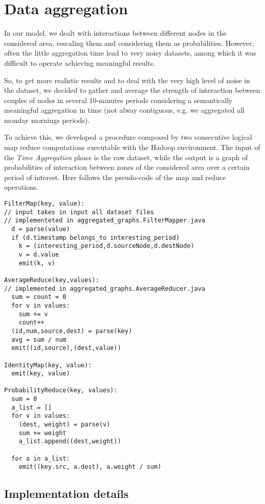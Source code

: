 \section{Data aggregation}
\label{aggregation}
In our model, we dealt with interactions between different nodes in the considered area, rescaling them and considering them as probabilities.
However, often the little aggregation time lead to very noisy datasets, among which it was difficult to operate achieving meaningful results.

So, to get more realistic results and to deal with the very high level of noise in the dataset,
we decided to gather and average the strength of interaction between couples of nodes in several 10-minutes periods
considering a semantically meaningful aggregation in time (not alway contiguous, e.g. we aggregated all monday
mornings periods).

To achieve this, we developed a procedure composed by two consecutive logical map reduce computations executable with the Hadoop environment.
The input of the \emph{Time Aggregation} phase is the raw dataset, while the output is a graph of probabilities of interaction between zones of the considered area
over a certain period of interest.
Here follows the pseudo-code of the map and reduce operations.

\begin{verbatim}
FilterMap(key, value):
// input takes in input all dataset files
// implementeted in aggregated_graphs.FilterMapper.java
  d = parse(value)
  if (d.timestamp belongs_to interesting_period)
  	k = (interesting_period,d.sourceNode,d.destNode)
  	v = d.value
    emit(k, v)

AverageReduce(key,values):
// implemented in aggregated_graphs.AverageReducer.java
  sum = count = 0
  for v in values:
  	sum += v
  	count++
  (id,num,source,dest) = parse(key)
  avg = sum / num
  emit((id,source),(dest,value))

IdentityMap(key, value):
  emit(key, value)

ProbabilityReduce(key, values):
  sum = 0
  a_list = []
  for v in values:
    (dest, weight) = parse(v)
    sum += weight
  	a_list.append((dest,weight))

  for a in a_list:
    emit((key.src, a.dest), a.weight / sum)
\end{verbatim}

\subsection{Implementation details}

